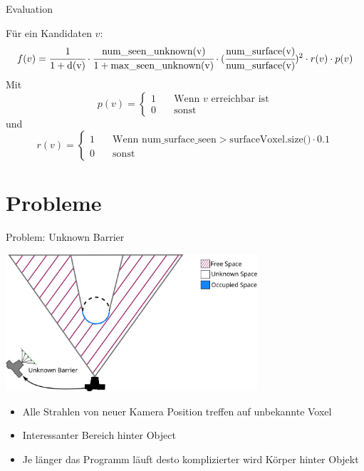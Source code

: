 \documentclass{beamer}
\begin{document}
\begin{frame}{Evaluation}
	\begin{block}{}
		Für ein Kandidaten $v$:
		\[f(v) = \cfrac{1}{1 + \text{d(v)}} \cdot \cfrac{\text{num\_seen\_unknown(v)}}{1 + \text{max\_seen\_unknown(v)}} \cdot (\cfrac{\text{num\_surface(v)}}{\text{num\_surface(v)}})^2 \cdot r(v) \cdot p(v)\]
		Mit \[p(v) = \begin{cases}
				1 & \quad \text{Wenn } v \text{ erreichbar ist} \\
				0 & \quad \text{sonst}
			\end{cases}\]
		und \[r(v) = \begin{cases}
				1 & \quad \text{Wenn  num\_surface\_seen} > \text{surfaceVoxel.size()} \cdot 0.1 \\
				0 & \quad \text{sonst}
			\end{cases}
		\]
	\end{block}
\end{frame}
\section{Probleme}
\begin{frame}{Problem: Unknown Barrier}
	\begin{block}{}
		\begin{center}
			\includegraphics[width=0.7\textwidth]{Graphics/unknown_barrier_v2.png}
		\end{center}
		\begin{itemize}
			\item Alle Strahlen von neuer Kamera Position treffen auf unbekannte Voxel
			\item Interessanter Bereich hinter Object
			\item Je länger das Programm läuft desto komplizierter wird Körper hinter Objekt
		\end{itemize}
	\end{block}
\end{frame}

\printbibliography
\end{document}
